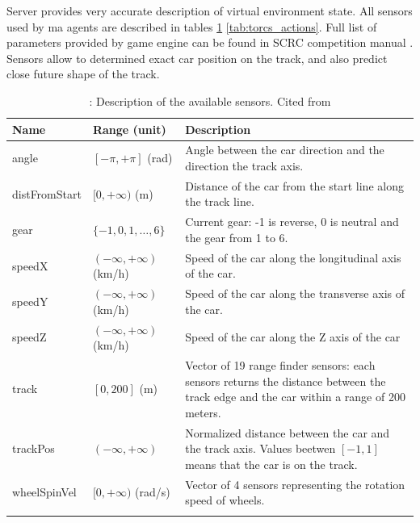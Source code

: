 \documentclass[declaration,shortabstract,english,inz]{iithesis}
\begin{document}
Server provides very accurate description of virtual environment state. All sensors used by ma agents are described in tables \ref{tab:torcs_sensors} \ref{tab:torcs_actions}.
Full list of parameters provided by game engine can be found in SCRC competition manual \cite{scrc_manual}. Sensors allow to determined exact car position on the track, and also predict close future shape of the track.


\begin{center}
    \begin{longtable}{ | p{} |p{}| p{} |}
     \hline
     \textbf{Name} & \textbf{Range (unit)} & \textbf{Description} \\ 
     \hline
     angle & $[-\pi, +\pi]$ (rad) & Angle between the car direction and the direction the track axis. \\  
     \hline
     distFromStart & $[0, +\infty)$ (m) & Distance of the car from the start line along the track line. \\
     \hline
     gear & $ \{ -1,0,1, \dots, 6 \} $ & Current gear: -1 is reverse, 0 is neutral and the gear from 1 to 6. \\
     \hline
     speedX & $ ( -\infty, +\infty ) $ (km/h) & Speed of the car along the longitudinal axis of the car. \\
     \hline
     speedY & $ ( -\infty, +\infty ) $ (km/h) & Speed of the car along the transverse axis of the car. \\
     \hline
     speedZ & $ ( -\infty, +\infty ) $ (km/h) & Speed of the car along the Z axis of the car \\
     \hline        
     track &  $[0, 200]$ (m) & Vector of 19 range finder sensors: each sensors returns the distance between the track edge and the car within a range of 200 meters. \\
     \hline
     trackPos & $( -\infty, +\infty )$ & Normalized distance between the car and the track axis. Values beetwen $[-1, 1]$ means that the car is on the track. \\
     \hline
     wheelSpinVel & $[0, +\infty)$ (rad/s) & Vector of 4 sensors representing the rotation speed of wheels. \\
     \hline
     \caption{\label{tab:torcs_sensors}: Description of the available sensors. Cited from \cite{scrc_manual}}
    \end{longtable}

\end{center}
\end{document}

